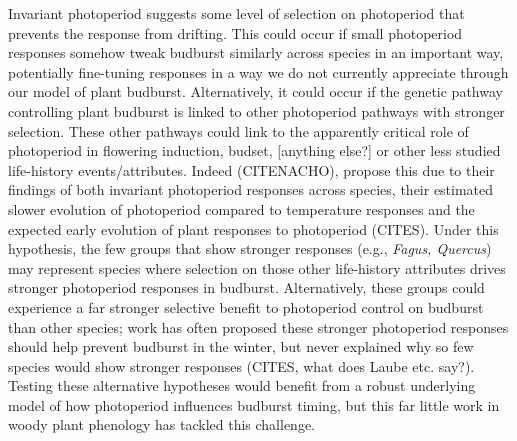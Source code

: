 \documentclass[11pt]{article}
\begin{document}
Invariant photoperiod suggests some level of selection on photoperiod that prevents the response from drifting. This could occur if small photoperiod responses somehow tweak budburst similarly across species in an important way, potentially fine-tuning responses in a way we do not currently appreciate through our model of plant budburst. Alternatively, it could occur if the genetic pathway controlling plant budburst is linked to other photoperiod pathways with stronger selection. These other pathways could link to the apparently critical role of photoperiod in flowering induction, budset, [anything else?] or other less studied life-history events/attributes. Indeed (CITENACHO), propose this due to their findings of both invariant photoperiod responses across species, their estimated slower evolution of photoperiod compared to temperature responses and the expected early evolution of plant responses to photoperiod (CITES). Under this hypothesis, the few groups that show stronger responses (e.g., \emph{Fagus, Quercus}) may represent species where selection on those other life-history attributes drives stronger photoperiod responses in budburst. Alternatively, these groups could experience a far stronger selective benefit to photoperiod control on budburst than other species; work has often proposed these stronger photoperiod responses should help prevent budburst in the winter, but never explained why so few species would show stronger responses (CITES, what does Laube etc. say?). Testing these alternative hypotheses would benefit from a robust underlying model of how photoperiod influences budburst timing, but this far little work in woody plant phenology has tackled this challenge.  
\end{document}
